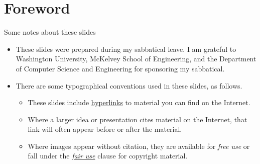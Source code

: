 
\section{Foreword}
\begin{frame}{Some notes about these slides}
\begin{itemize}[<+->]
    \item These slides were prepared during my sabbatical leave.  I am grateful to Washington University, McKelvey School of Engineering, and the Department of Computer Science and Engineering for sponsoring my sabbatical.
    \item There are some typographical conventions used in these slides, as follows.
    \begin{itemize}
        \item These slides include \href{https://en.wikipedia.org/wiki/Hyperlink}{hyperlinks} to material you can find on the Internet.
        \item Where a larger idea or presentation cites material on the Internet, that link will often appear before or after the material. 
        \item Where images appear without citation, they are available for \emph{free use} or fall under the \href{https://en.wikipedia.org/wiki/Fair_use}{\emph{fair use}} clause for copyright material. 
    \end{itemize}
\end{itemize}
\end{frame}

